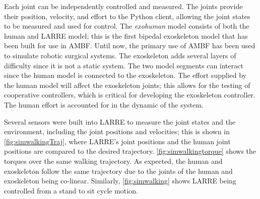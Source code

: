  
 Each joint can be independently controlled and measured. The joints provide their position, velocity, and effort to the Python client, allowing the joint states to be measured and used for control. The \textit{exohuman} model consists of both the human and LARRE model; this is the first bipedal exoskeleton model that has been built for use in AMBF. Until now, the primary use of AMBF has been used to simulate robotic surgical systems. The exoskeleton adds several layers of difficulty since it is not a static system. The two model segments can interact since the human model is connected to the exoskeleton. The effort supplied by the human model will affect the exoskeleton joints; this allows for the testing of cooperative controllers, which is critical for developing the exoskeleton controller. The human effort is accounted for in the dynamic of the system.  
 
 
 Several sensors were built into LARRE to measure the joint states and the environment, including the joint positions and velocities; this is shown in \autoref{fig:simwalkingTraj}, where LARRE's joint positions and the human joint positions are compared to the desired trajectory.  \autoref{fig:simwalkingtorque} shows the torques over the same walking trajectory. As expected, the human and exoskeleton follow the same trajectory due to the joints of the human and exoskeleton being co-linear. Similarly, \autoref{fig:simwalking} shows LARRE being controlled from a stand to sit cycle motion.
 
